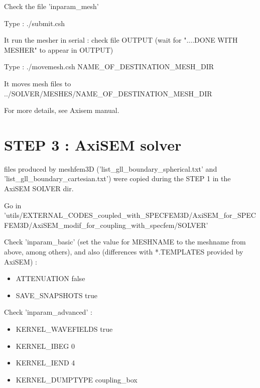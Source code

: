 \documentclass[11pt]{article}
\begin{document}
\medskip

\noindent Check the file 'inparam\_mesh'

\medskip

\noindent Type : ./submit.csh

\medskip

\noindent It run the mesher in serial : check file OUTPUT (wait for "....DONE WITH MESHER" to appear in OUTPUT)

\medskip

\noindent Type : ./movemesh.csh NAME\_OF\_DESTINATION\_MESH\_DIR

\medskip

\noindent It moves mesh files to ../SOLVER/MESHES/NAME\_OF\_DESTINATION\_MESH\_DIR

\medskip

\noindent For more details, see Axisem manual.

\section{STEP 3 : AxiSEM solver}

 files produced by meshfem3D ('list\_gll\_boundary\_spherical.txt' and 'list\_gll\_boundary\_cartesian.txt') were copied during the STEP 1 in the AxiSEM SOLVER dir.

\medskip

\noindent Go in {\scriptsize 'utils/EXTERNAL\_CODES\_coupled\_with\_SPECFEM3D/AxiSEM\_for\_SPECFEM3D/AxiSEM\_modif\_for\_coupling\_with\_specfem/SOLVER'}

\medskip

\noindent Check 'inparam\_basic' (set the value for MESHNAME to the meshname from above, among others), and also (differences with *.TEMPLATES provided
by AxiSEM) :

\begin{itemize}

\item[\textbullet] ATTENUATION         false
\item[\textbullet] SAVE\_SNAPSHOTS     true

\end{itemize}

\medskip

\noindent Check 'inparam\_advanced' :

\begin{itemize}

\item[\textbullet] KERNEL\_WAVEFIELDS   true
\item[\textbullet] KERNEL\_IBEG         0
\item[\textbullet] KERNEL\_IEND         4
\item[\textbullet] KERNEL\_DUMPTYPE     coupling\_box

\end{itemize}
\end{document}
